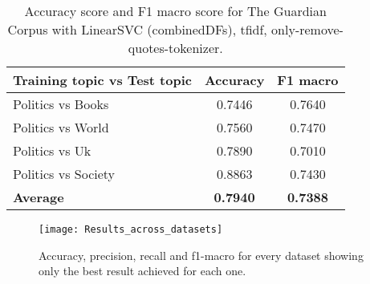 \begin{table}[h!]
	\begin{center}  
		\caption[The Guardian Corpus Results]{Accuracy score and F1 macro score for The Guardian Corpus with LinearSVC (combinedDFs), tfidf, only-remove-quotes-tokenizer.} 
		\label{tab:tableTGC}
		\begin{tabular}{| p{5 cm} | c | c |}
			\hline 
			Training topic vs Test topic & Accuracy & F1 macro \\
			\hline
			Politics vs Books & 0.7446 & 0.7640 \\ \hline
			Politics vs World & 0.7560 & 0.7470 \\ \hline
			Politics vs Uk & 0.7890 & 0.7010 \\ \hline
			Politics vs Society & 0.8863 & 0.7430 \\ \hline
			\textbf{Average} & \textbf{0.7940} & \textbf{0.7388} \\ \hline
		\end{tabular} 
	\end{center}
\end{table}


\begin{figure}[ht]
	\centering
	\texttt{[image: Results\_across\_datasets]}
	\caption[Best performance across all datasets]{Accuracy, precision, recall and f1-macro for every dataset showing only the best result achieved for each one.}
	\label{fig:results_across_datasets}
\end{figure}
